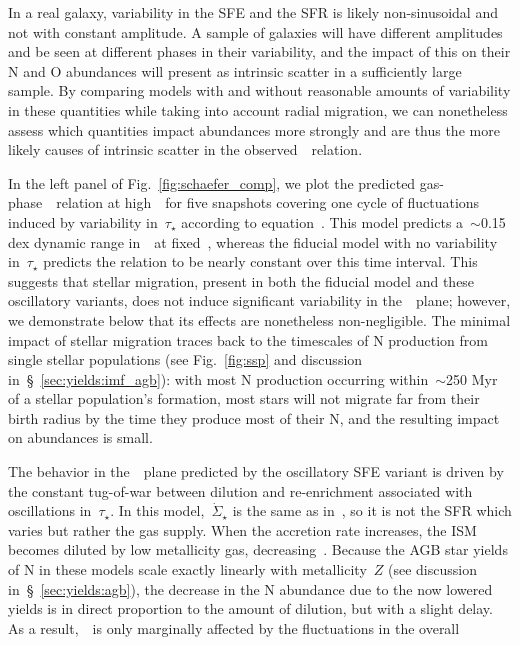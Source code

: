 \documentclass[ms.tex]{subfiles}
\begin{document}
In a real galaxy, variability in the SFE and the SFR is likely non-sinusoidal
and not with constant amplitude.
A sample of galaxies will have different amplitudes and be seen at different
phases in their variability, and the impact of this on their N and O abundances
will present as intrinsic scatter in a sufficiently large sample.
By comparing models with and without reasonable amounts of variability in these
quantities while taking into account radial migration, we can nonetheless
assess which quantities impact abundances more strongly and are thus the more
likely causes of intrinsic scatter in the observed~\ohno~relation.
\par
In the left panel of Fig.~\ref{fig:schaefer_comp}, we plot the predicted
gas-phase~\ohno~relation at high~\oh~for five snapshots covering one cycle of
fluctuations induced by variability in~$\tau_\star$ according to
equation~.
This model predicts a~$\sim$0.15 dex dynamic range in~\no~at fixed~\oh, whereas
the fiducial model with no variability in~$\tau_\star$ predicts the relation
to be nearly constant over this time interval.
This suggests that stellar migration, present in both the fiducial model and
these oscillatory variants, does not induce significant variability in
the~\ohno~plane; however, we demonstrate below that its effects are nonetheless
non-negligible.
The minimal impact of stellar migration traces back to the timescales of N
production from single stellar populations (see Fig.~\ref{fig:ssp} and
discussion in~\S~\ref{sec:yields:imf_agb}): with most N production occurring
within~$\sim$250 Myr of a stellar population's formation, most stars will not
migrate far from their birth radius by the time they produce most of their N,
and the resulting impact on abundances is small.
\par
The behavior in the~\ohno~plane predicted by the oscillatory SFE variant
is driven by the constant tug-of-war between dilution and re-enrichment
associated with oscillations in~$\tau_\star$.
In this model,~$\dot{\Sigma}_\star$ is the same as in~\citet{Johnson2021}, so
it is not the SFR which varies but rather the gas supply.
When the accretion rate increases, the ISM becomes diluted by low metallicity
gas, decreasing~\oh.
Because the AGB star yields of N in these models scale exactly linearly with
metallicity~$Z$ (see discussion in~\S~\ref{sec:yields:agb}), the decrease in
the N abundance due to the now lowered yields is in direct proportion to the
amount of dilution, but with a slight delay.
As a result,~\no~is only marginally affected by the fluctuations in the overall
\end{document}
